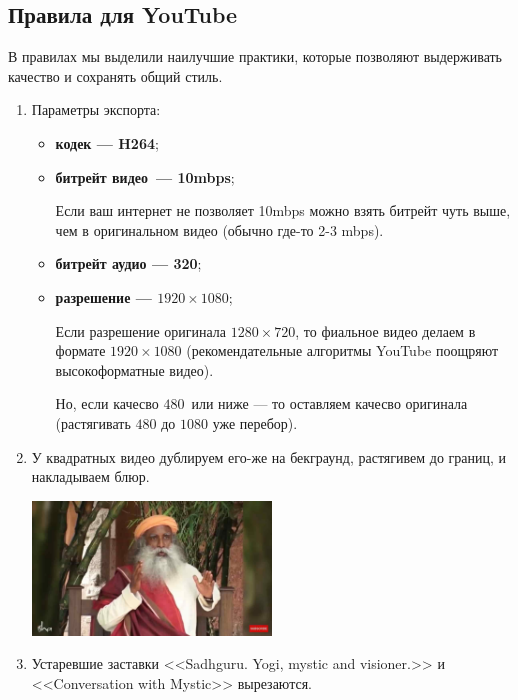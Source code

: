 \documentclass[
a4paper, %
12pt, %
article,
onecolumn, %
openany, %
]{memoir}
\begin{document}
\subsection{Правила для YouTube}
В правилах мы выделили наилучшие практики, которые позволяют выдерживать качество и сохранять общий стиль.
\begin{enumerate}
\item Параметры экспорта:
    \begin{itemize}
        \item \textbf{кодек --- H264};
        \item \textbf{битрейт видео~--- 10mbps};

        Если ваш интернет не позволяет 10mbps можно взять битрейт чуть выше, чем в 
        оригинальном видео (обычно где-то 2-3 mbps).

        \item \textbf{битрейт аудио --- 320};
        \item \textbf{разрешение --- $1920 \times 1080$};
       
        Если разрешение оригинала $1280 \times 720$,
            то фиальное видео делаем в формате
        $1920 \times 1080$ {\color{gray}(рекомендательные алгоритмы 
            YouTube поощряют 
        высокоформатные видео)}. 

        Но, если качесво $480$\ или ниже --- то оставляем 
        качесво оригинала {\color{gray}(растягивать $480$ до $1080$ уже перебор)}.
    \end{itemize}



\item У квадратных видео дублируем его-же на бекграунд, растягивем до границ, и накладываем блюр.

	\begin{center} \includegraphics[width=0.5\textwidth]{tooWide}  \end{center}

\item Устаревшие заставки <<Sadhguru. Yogi, mystic and visioner.>> и <<Conversation with Mystic>> вырезаются. 


\end{enumerate}
\end{document}
